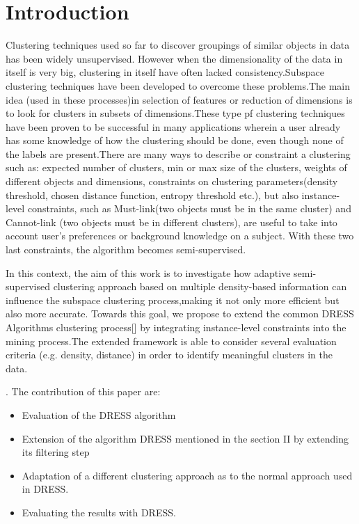 \documentclass[10pt, conference, compsocconf]{IEEEtran}
\begin{document}
\section{Introduction}

Clustering techniques used so far to discover groupings of similar objects in data
has been widely unsupervised. However when the dimensionality of the data in itself is very big,
clustering in itself have often lacked consistency.Subspace clustering techniques have been developed
to overcome these problems.The main idea (used in these processes)in selection of features or reduction of dimensions is to look for clusters in subsets of dimensions.These type pf clustering techniques have been proven to be successful in many applications wherein a user already has some knowledge of how the clustering should be done, even though none of the labels are present.There are many ways to describe or constraint a clustering such as: expected number of clusters, min or max size of the clusters, weights of different objects and dimensions, constraints on clustering parameters(density threshold, chosen distance function, entropy threshold etc.), but also instance-level constraints, such as Must-link(two objects must be in the same cluster) and Cannot-link (two objects must be in different clusters), are useful to take into account user’s preferences or background knowledge on a subject. With these two last constraints, the algorithm becomes semi-supervised.

In this context, the aim of this work is to investigate how adaptive semi-supervised clustering approach based on
multiple density-based information can influence the subspace clustering process,making it not only more efficient but also more accurate.
Towards this goal, we propose to extend the common DRESS Algorithms clustering process[] by integrating instance-level constraints into the mining process.The extended framework is able to consider several evaluation criteria (e.g. density, distance) in order to identify meaningful clusters in the data.


. The contribution  of this paper are:
\begin{itemize}
\item{Evaluation of the DRESS algorithm}
\item{Extension of the algorithm DRESS mentioned in the section II by extending its filtering step}
\item{Adaptation of a different clustering approach as to the normal approach used in DRESS.}
\item {Evaluating the results with DRESS.}
\end{itemize}
\end{document}
